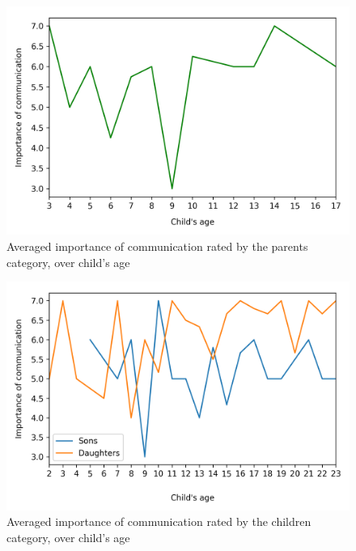 \begin{figure}[H]
    \centering
    \includegraphics[scale=0.58]{plots/plot_1.png}
    \caption{Averaged importance of communication rated by the parents category, over child's age}
    \label{fig:plot_1}
\end{figure}

\begin{figure}[H]
    \centering
    \includegraphics[scale=0.58]{plots/plot_2.png}
    \caption{Averaged importance of communication rated by the children category, over child's age}
    \label{fig:plot_2}
\end{figure}

